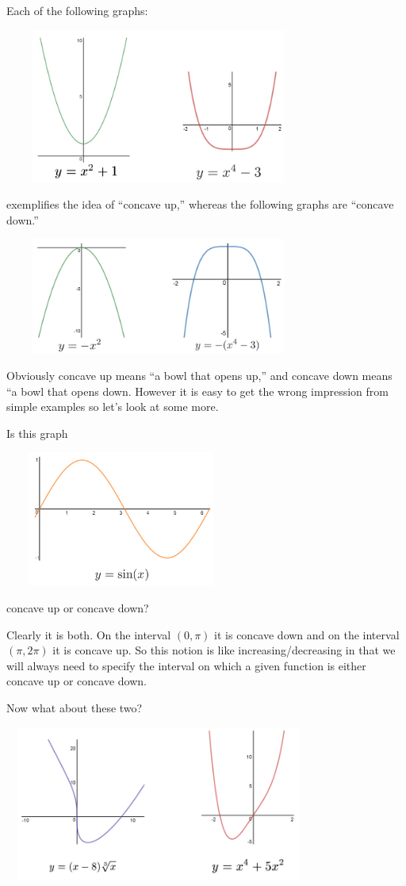 Each of the following graphs:\\
\centerline{\includegraphics*[height=2in,width=4in]{Figures/ConcaveUp}}
exemplifies the idea of ``concave up,'' whereas the following graphs are ``concave down.''\\
\centerline{\includegraphics*[height=1.5in,width=4in]{Figures/ConcaveDown}}

Obviously concave up means ``a bowl that opens up,'' and concave down
means ``a bowl that opens down. However it is easy to get the wrong
impression from simple examples so let's look at some more.

Is this graph\\
\centerline{\includegraphics*[height=1.75in,width=3in]{Figures/ConcaveUpDown}}
concave up or concave down? 

Clearly it is both. On the interval $(0,\pi)$ it is concave down and
on the interval $(\pi,2\pi)$ it is concave up. So this notion is like
increasing/decreasing in that we will always need to specify the
interval on which a given function is either concave up or concave down.

Now what about these two?\\
\centerline{\includegraphics*[height=2in,width=4in]{Figures/ConcaveUpDownUnclear}}

